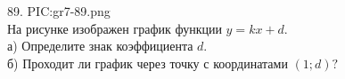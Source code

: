 89. {{PIC:gr7-89.png}}\\
На рисунке изображен график функции $y=kx+d.$\\
а) Определите знак коэффициента $d.$\\
б) Проходит ли график через точку с координатами $(1; d) ?$\\
